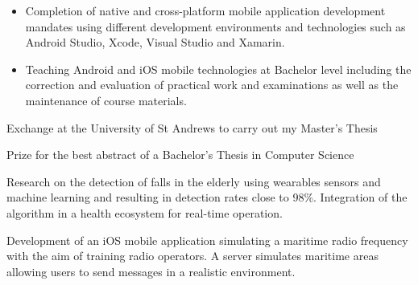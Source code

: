 \documentclass[10pt,a4paper,ragged2e,withhyper,academicons]{altacv}
\begin{document}
\begin{paracol}{2}




\begin{itemize}
	\item Completion of native and cross-platform mobile application development mandates using different development environments and technologies such as Android Studio, Xcode, Visual Studio and Xamarin.
	\item Teaching Android and iOS mobile technologies at Bachelor level including the correction and evaluation of practical work and examinations as well as the maintenance of course materials.
\end{itemize}

\smallskip




\faArrowsAltH Exchange at the University of St Andrews to carry out my Master's Thesis

\divider

\faTrophy Prize for the best abstract of a Bachelor's Thesis in Computer Science

\smallskip




Research on the detection of falls in the elderly using wearables sensors and machine learning and resulting in detection rates close to 98\%. Integration of the algorithm in a health ecosystem for real-time operation.

\divider

Development of  an iOS mobile application simulating a maritime radio frequency with the aim of training radio operators. A server simulates maritime areas allowing users to send messages in a realistic environment.


\end{paracol}
\end{document}
